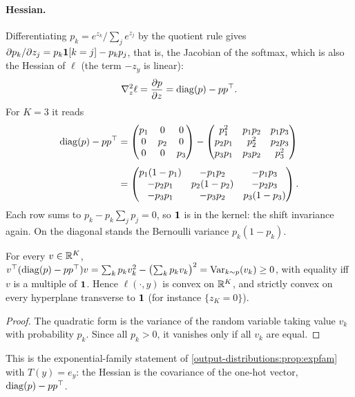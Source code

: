\begin{notechapter}
\paragraph{Hessian.} Differentiating $p_k = e^{z_k}/\sum_je^{z_j}$ by the quotient rule gives
$\partial p_k/\partial z_j = p_k\mathbf{1}[k = j] - p_kp_j$, that is, the Jacobian of the softmax, which is also
the Hessian of $\ell$ (the term $-z_y$ is linear):
\[
  \nabla^2_z\ell = \frac{\partial p}{\partial z} = \operatorname{diag}(p) - pp^\top .
\]
For $K = 3$ it reads
\begin{align*}
  \operatorname{diag}(p) - pp^\top
  &= \begin{pmatrix}p_1&0&0\\0&p_2&0\\0&0&p_3\end{pmatrix}
  - \begin{pmatrix}p_1^2&p_1p_2&p_1p_3\\p_2p_1&p_2^2&p_2p_3\\p_3p_1&p_3p_2&p_3^2\end{pmatrix}\\[4pt]
  &= \begin{pmatrix}p_1(1 - p_1)&-p_1p_2&-p_1p_3\\-p_2p_1&p_2(1 - p_2)&-p_2p_3\\-p_3p_1&-p_3p_2&p_3(1 - p_3)\end{pmatrix}.
\end{align*}
Each row sums to $p_k - p_k\sum_jp_j = 0$, so $\mathbf{1}$ is in the kernel: the shift
invariance again. On the diagonal stands the Bernoulli variance $p_k(1 - p_k)$.

\begin{proposition}[Convexity]\label{sigmoid-softmax:prop:convex}
For every $v\in\mathbb{R}^K$, $v^\top(\operatorname{diag}(p) - pp^\top)v = \sum_kp_kv_k^2 - \bigl(\sum_kp_kv_k\bigr)^2 = \operatorname{Var}_{k\sim p}(v_k)\geq0$, with
equality iff $v$ is a multiple of $\mathbf{1}$. Hence $\ell(\cdot, y)$ is convex on $\mathbb{R}^K$, and strictly
convex on every hyperplane transverse to $\mathbf{1}$ (for instance $\{z_K = 0\}$).
\end{proposition}

\begin{proof}
The quadratic form is the variance of the random variable taking value $v_k$ with
probability $p_k$. Since all $p_k>0$, it vanishes only if all $v_k$ are equal.
\end{proof}

This is the exponential-family statement of \cref{output-distributions:prop:expfam} with
$T(y) = e_y$: the Hessian is the covariance of the one-hot vector, $\operatorname{diag}(p) - pp^\top$.


\end{notechapter}
